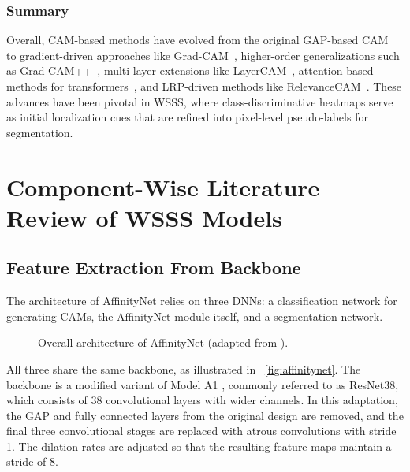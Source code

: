 \subsubsection{Summary}
Overall, CAM-based methods have evolved from the original GAP-based CAM~\cite{cam} to gradient-driven approaches like Grad-CAM~\cite{cam_grad}, higher-order generalizations such as Grad-CAM++~\cite{cam_gradpp}, multi-layer extensions like LayerCAM~\cite{layer_cam}, attention-based methods for transformers~\cite{attention_rollout}, and LRP-driven methods like RelevanceCAM~\cite{relevance_cam}. These advances have been pivotal in WSSS, where class-discriminative heatmaps serve as initial localization cues that are refined into pixel-level pseudo-labels for segmentation.

\section{Component-Wise Literature Review of WSSS Models}
\label{sec:how-wsss-models-work}

\subsection{Feature Extraction From Backbone}
\label{subsec:feature-extraction-backbone}

The architecture of AffinityNet \cite{wsss_affinitynet} relies on three DNNs: a classification network for generating CAMs, the AffinityNet module itself, and a segmentation network. 
\begin{figure}[htbp]
    \centering
    \caption{Overall architecture of AffinityNet (adapted from \cite{wsss_affinitynet}).}
    \label{fig:affinitynet}
\end{figure}

All three share the same backbone, as illustrated in ~\autoref{fig:affinitynet}. The backbone is a modified variant of Model A1 \cite{RevisitingResNET}, commonly referred to as ResNet38, which consists of 38 convolutional layers with wider channels. In this adaptation, the GAP and fully connected layers from the original design are removed, and the final three convolutional stages are replaced with atrous convolutions with stride 1. The dilation rates are adjusted so that the resulting feature maps maintain a stride of 8.

